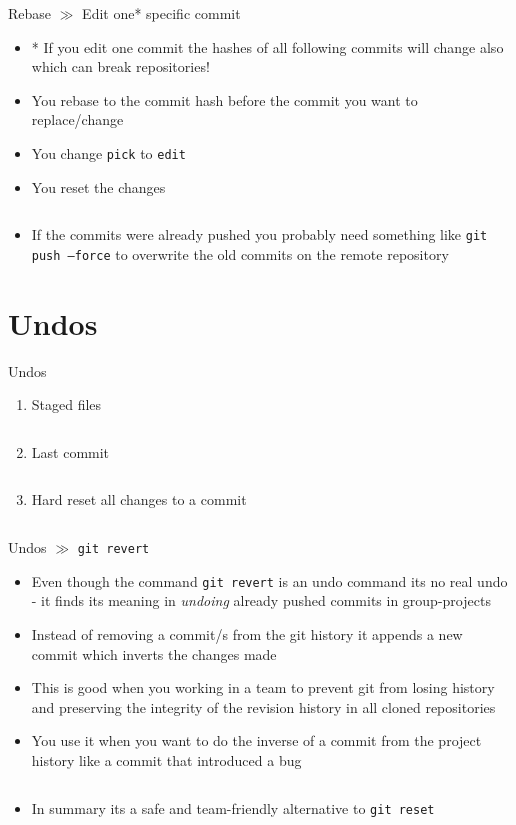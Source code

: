 \documentclass[10pt]{beamer}
\begin{document}
\begin{frame}{Rebase $\gg$ Edit one* specific commit}
    \begin{itemize}
        \item * If you edit one commit the hashes of all following commits will change also which can break repositories!
        \item You rebase to the commit hash before the commit you want to replace/change
        \item You change \texttt{pick} to \texttt{edit}
        \item You reset the changes
        \inputminted[bgcolor=lightGreyCustom,fontsize=\scriptsize]{sh}{./resources/git_rebase_04_example_remove_directory.sh}
        \item If the commits were already pushed you probably need something like \texttt{git push --force} to overwrite the old commits on the remote repository
    \end{itemize}
\end{frame}

\section{Undos}

\begin{frame}{Undos}
	\begin{enumerate}
		\item Staged files
		\inputminted[bgcolor=lightGreyCustom,fontsize=\scriptsize]{sh}{./resources/git_undos_01_stage_files.sh}
		\item Last commit
		\inputminted[bgcolor=lightGreyCustom,fontsize=\scriptsize]{sh}{./resources/git_undos_02_last_commit.sh}
		\item  Hard reset all changes to a commit
		\inputminted[bgcolor=lightGreyCustom,fontsize=\scriptsize]{sh}{./resources/git_undos_03_hard_reset.sh}
	\end{enumerate}
\end{frame}

\begin{frame}{Undos $\gg$ \texttt{git revert}}
\begin{itemize}
	\item Even though the command \texttt{git revert} is an undo command its no real undo - it finds its meaning in \textit{undoing} already pushed commits in group-projects
	\item Instead of removing a commit/s from the git history it appends a new commit which inverts the changes made
	\item This is good when you working in a team to prevent git from losing history and preserving the integrity of the revision history in all cloned repositories
	\item You use it when you want to do the inverse of a commit from the project history like a commit that introduced a bug
	\inputminted[bgcolor=lightGreyCustom,fontsize=\scriptsize]{sh}{./resources/git_revert_01_revert.sh}
	\item In summary its a safe and team-friendly alternative to \texttt{git reset}
\end{itemize}
\end{frame}
\end{document}
